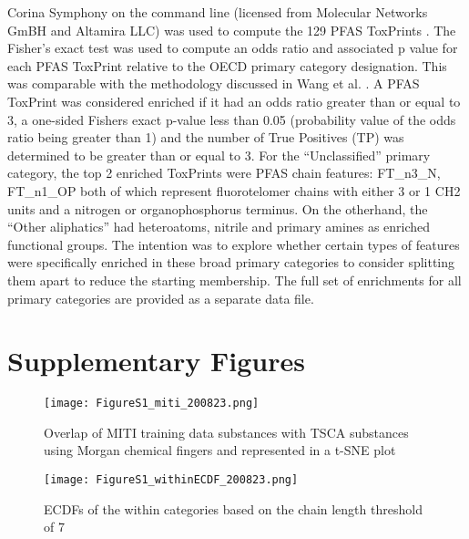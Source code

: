 \documentclass[
  super,
  preprint,
  3p]{elsarticle}
\begin{document}
Corina Symphony on the command line (licensed from Molecular Networks
GmBH and Altamira LLC) was used to compute the 129 PFAS ToxPrints
\citep{richard_new_2023}. The Fisher's exact test was used to compute an
odds ratio and associated p value for each PFAS ToxPrint relative to the
OECD primary category designation. This was comparable with the
methodology discussed in Wang et al. \citep{wang_high-throughput_2019}.
A PFAS ToxPrint was considered enriched if it had an odds ratio greater
than or equal to 3, a one-sided Fishers exact p-value less than 0.05
(probability value of the odds ratio being greater than 1) and the
number of True Positives (TP) was determined to be greater than or equal
to 3. For the ``Unclassified'' primary category, the top 2 enriched
ToxPrints were PFAS chain features: FT\_n3\_N, FT\_n1\_OP both of which
represent fluorotelomer chains with either 3 or 1 CH2 units and a
nitrogen or organophosphorus terminus. On the otherhand, the ``Other
aliphatics'' had heteroatoms, nitrile and primary amines as enriched
functional groups. The intention was to explore whether certain types of
features were specifically enriched in these broad primary categories to
consider splitting them apart to reduce the starting membership. The
full set of enrichments for all primary categories are provided as a
separate data file.

\newpage{}

\hypertarget{supplementary-figures}{%
\section*{Supplementary Figures}\label{supplementary-figures}}

\begin{figure}

{\centering \texttt{[image: FigureS1\_miti\_200823.png]}

}

\caption{\label{fig-miti}Overlap of MITI training data substances with
TSCA substances using Morgan chemical fingers and represented in a t-SNE
plot}

\end{figure}

\begin{figure}

{\centering \texttt{[image: FigureS1\_withinECDF\_200823.png]}

}

\caption{\label{fig-ecdfs-within}ECDFs of the within categories based on
the chain length threshold of 7}

\end{figure}
\end{document}
